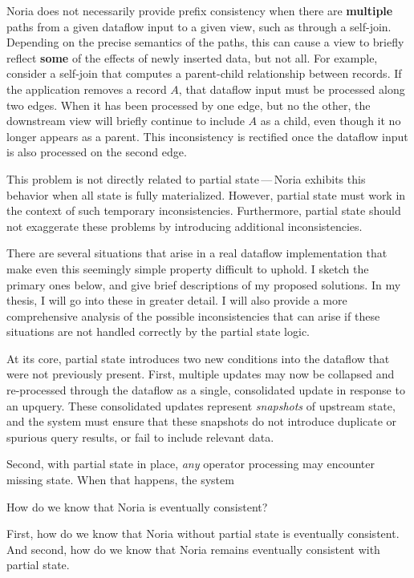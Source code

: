 Noria does not necessarily provide prefix consistency when there are
\textbf{multiple} paths from a given dataflow input to a given view, such as
through a self-join. Depending on the precise semantics of the paths, this can
cause a view to briefly reflect \textbf{some} of the effects of newly inserted
data, but not all. For example, consider a self-join that computes a
parent-child relationship between records. If the application removes a record
$A$, that dataflow input must be processed along two edges. When it has been
processed by one edge, but no the other, the downstream view will briefly
continue to include $A$ as a child, even though it no longer appears as a
parent. This inconsistency is rectified once the dataflow input is also
processed on the second edge.

This problem is not directly related to partial state\,---\,Noria exhibits this
behavior when all state is fully materialized. However, partial state must work
in the context of such temporary inconsistencies. Furthermore, partial state
should not exaggerate these problems by introducing additional inconsistencies.

There are several situations that arise in a real dataflow implementation that
make even this seemingly simple property difficult to uphold. I sketch the
primary ones below, and give brief descriptions of my proposed solutions. In my
thesis, I will go into these in greater detail. I will also provide a more
comprehensive analysis of the possible inconsistencies that can arise if these
situations are not handled correctly by the partial state logic.

At its core, partial state introduces two new conditions into the dataflow that
were not previously present. First, multiple updates may now be collapsed and
re-processed through the dataflow as a single, consolidated update in response
to an upquery. These consolidated updates represent \textit{snapshots} of
upstream state, and the system must ensure that these snapshots do not introduce
duplicate or spurious query results, or fail to include relevant data.

Second, with partial state in place, \emph{any} operator processing may
encounter missing state. When that happens, the system

How do we know that Noria is eventually consistent?

First, how do we know that Noria without partial state is eventually
consistent. And second, how do we know that Noria remains eventually
consistent with partial state.

